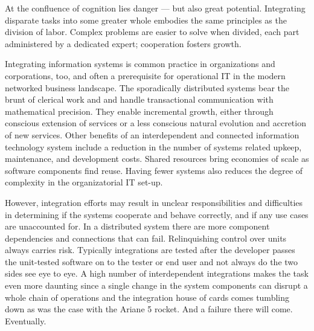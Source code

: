 \documentclass[12pt,a4paper,oneside,pdftex]{report}
\begin{document}
At the confluence of cognition lies danger --- but also great potential. Integrating disparate tasks into some greater whole embodies the same principles as the division of labor. Complex problems are easier to solve when divided, each part administered by a dedicated expert; cooperation fosters growth.

Integrating information systems is common practice in organizations and corporations, too, and often a prerequisite for operational IT in the modern networked business landscape. The sporadically distributed systems bear the brunt of clerical work and and handle transactional communication with mathematical precision. They enable incremental growth, either through conscious extension of services or a less conscious natural evolution and accretion of new services. Other benefits of an interdependent and connected information technology system include a reduction in the number of systems related upkeep, maintenance, and development costs. Shared resources bring economies of scale as software components find reuse. \citep{rehman2007testing} Having fewer systems also reduces the degree of complexity in the organizatorial IT set-up.

\begin{comment}
Automation is one of the great boons brought on by technological development on one hand freeing up resources like labour for more value-adding purposes --- and permitting the execution of uniform, repeatable processes and process control on the other. The pinnacle of advancement and prosperity on which society stands today is based on a continuous flow of various automated tasks and electronic services, many of which are complex and involve a slew of actors or agents. Work is divided and its completion therefore requires cooperation between service systems.
\end{comment}

However, integration efforts may result in unclear responsibilities and difficulties in determining if the systems cooperate and behave correctly, and if any use cases are unaccounted for. In a distributed system there are more component dependencies and connections that can fail. Relinquishing control over units always carries risk. Typically integrations are tested after the developer passes the unit-tested software on to the tester or end user and not always do the two sides see eye to eye. A high number of interdependent integrations makes the task even more daunting since a single change in the system components can disrupt a whole chain of operations and the integration house of cards comes tumbling down as was the case with the Ariane 5 rocket. And a failure there will come. Eventually.
\end{document}
